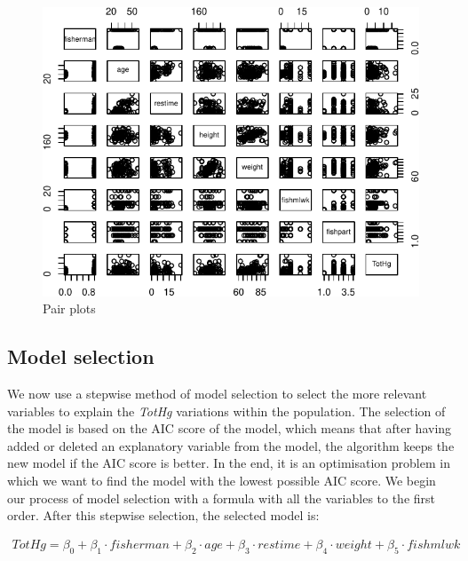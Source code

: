 \documentclass[12pt,]{article}
\begin{document}
\begin{figure}[htbp]

{\centering \includegraphics{Report_files/figure-latex/unnamed-chunk-8-1} 

}

\caption{\label{fig:pair_plots}Pair plots}\label{fig:unnamed-chunk-8}
\end{figure}

\subsection{Model selection}\label{model-selection}

We now use a stepwise method of model selection to select the more
relevant variables to explain the \emph{TotHg} variations within the
population. The selection of the model is based on the AIC score of the
model, which means that after having added or deleted an explanatory
variable from the model, the algorithm keeps the new model if the AIC
score is better. In the end, it is an optimisation problem in which we
want to find the model with the lowest possible AIC score. We begin our
process of model selection with a formula with all the variables to the
first order. After this stepwise selection, the selected model is:

\begin{equation}
\label{eqn:fullmodel}
\begin{split}
TotHg = \beta_0 + \beta_1 \cdot fisherman  + \beta_2 \cdot age + \beta_3 \cdot restime + \beta_4 \cdot weight + \beta_5 \cdot fishmlwk
\end{split}
\end{equation}
\end{document}
